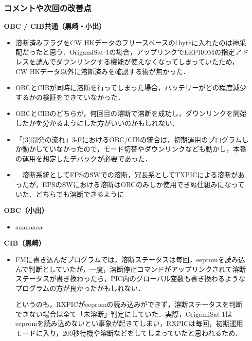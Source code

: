 \subsubsection{コメントや次回の改善点}
\hspace{2ex}
\textbf{OBC / CIB共通（黒崎・小出）}
\begin{itemize}
	\item 溶断済みフラグをCW HKデータのフリースペースの1byteに入れたのは神采配だったと思う．OrigamiSat-1の場合，アップリンクでEEPROMの指定アドレスを読んでダウンリンクする機能が使えなくなってしまっていたため，CW HKデータ以外に溶断済みを確認する術が無かった．
	\item OBCとCIBが同時に溶断を行ってしまった場合，バッテリーがどの程度減少するかの検証をできていなかった．
	\item OBCとCIBのどちらが，何回目の溶断で溶断を成功し，ダウンリンクを開始したかを分かるようにした方がいいのかもしれない．
	\item 「(3)開発の流れ」3-FにおけるOBC/CIBの統合は，初期運用のプログラムしか動かしていなかったので，モード切替やダウンリンクなども動かし，本番の運用を想定したデバックが必要であった．
	\item　溶断系統としてEPSのSWでの溶断，冗長系としてTXPICによる溶断があったが，EPSのSWにおける溶断はOBCのみしか使用できぬ仕組みになっていた．どちらでも溶断できるように
\end{itemize}

\hspace{2ex}
\textbf{OBC（小出）}
\begin{itemize}
	\item aaaaaaaa
\end{itemize}

\hspace{2ex}
\textbf{CIB（黒崎）}
\begin{itemize}
	\item FMに書き込んだプログラムでは，溶断ステータスは毎回，eepromを読み込んで判断としていたが，一度，溶断停止コマンドがアップリンクされて溶断ステータスが書き換わったら，PIC内のグローバル変数も書き換わるようなプログラムの方が良かったかもしれない．
	
	というのも，RXPICがeepromの読み込みができず，溶断ステータスを判断できない場合は全て「未溶断」判定にしていた．実際，OrigamiSat-1はeepromを読み込めないとい事象が起きてしまい，RXPICは毎回，初期運用モードに入り，200秒待機や溶断などをしてしまっていたと思われるため．
\end{itemize}